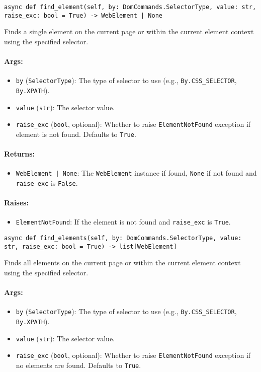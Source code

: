 \documentclass{article}
\begin{document}
\noindent\texttt{async def find\_element(self, by: DomCommands.SelectorType, value: str, raise\_exc: bool = True) -> WebElement | None}

\noindent Finds a single element on the current page or within the current element context using the specified selector.

\paragraph{Args:}
\begin{itemize}
    \item \texttt{by} (\texttt{SelectorType}): The type of selector to use (e.g., \texttt{By.CSS\_SELECTOR}, \texttt{By.XPATH}).
    \item \texttt{value} (\texttt{str}): The selector value.
    \item \texttt{raise\_exc} (\texttt{bool}, optional): Whether to raise \texttt{ElementNotFound} exception if element is not found. Defaults to \texttt{True}.
\end{itemize}

\paragraph{Returns:}
\begin{itemize}
    \item \texttt{WebElement | None}: The \texttt{WebElement} instance if found, \texttt{None} if not found and \texttt{raise\_exc} is \texttt{False}.
\end{itemize}

\paragraph{Raises:}
\begin{itemize}
    \item \texttt{ElementNotFound}: If the element is not found and \texttt{raise\_exc} is \texttt{True}.
\end{itemize}

\noindent\texttt{async def find\_elements(self, by: DomCommands.SelectorType, value: str, raise\_exc: bool = True) -> list[WebElement]}

\noindent Finds all elements on the current page or within the current element context using the specified selector.

\paragraph{Args:}
\begin{itemize}
    \item \texttt{by} (\texttt{SelectorType}): The type of selector to use (e.g., \texttt{By.CSS\_SELECTOR}, \texttt{By.XPATH}).
    \item \texttt{value} (\texttt{str}): The selector value.
    \item \texttt{raise\_exc} (\texttt{bool}, optional): Whether to raise \texttt{ElementNotFound} exception if no elements are found. Defaults to \texttt{True}.
\end{itemize}
\end{document}
